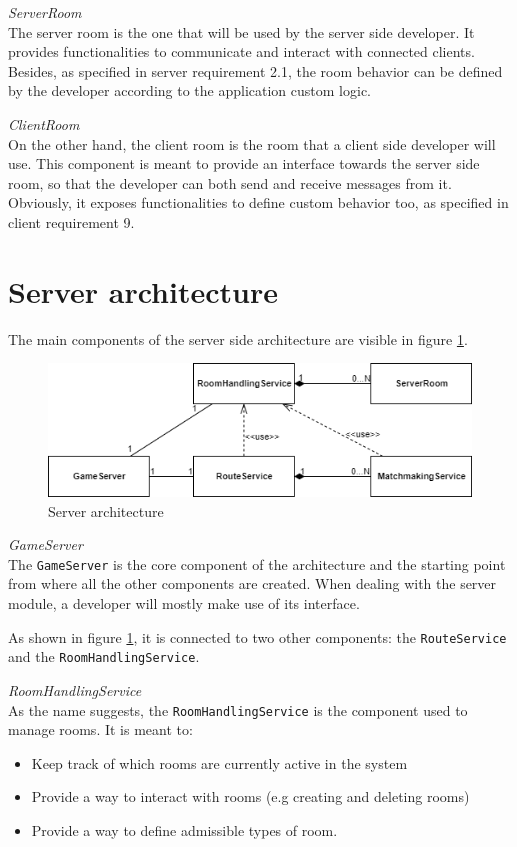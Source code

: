 \bigskip
\textit{ServerRoom}
\\
The server room is the one that will be used by the server side developer. It provides functionalities to communicate and interact with connected clients. Besides, as specified in server requirement 2.1, the room behavior can be defined by the developer according to the application custom logic.

\bigskip
\textit{ClientRoom}
\\
On the other hand, the client room is the room that a client side developer will use. This component is meant to provide an interface towards the server side room, so that the developer can both send and receive messages from it. Obviously, it exposes functionalities to define custom behavior too, as specified in client requirement 9.

\section{Server architecture} \label{sec:server_arch}
The main components of the server side architecture are visible in figure \ref{fig:server_classes}. 

\begin{figure}[H]
	\centering
	\includegraphics[scale=0.7]{images/3-architecture/server-architecture.png}
	\caption{Server architecture}
	\label{fig:server_classes}
\end{figure}

\bigskip
\textit{GameServer}
\\
The \texttt{GameServer} is the core component of the architecture and the starting point from where all the other components are created.
When dealing with the server module, a developer will mostly make use of its interface.

As shown in figure \ref{fig:server_classes}, it is connected to two other components: the \texttt{RouteService} and the \texttt{RoomHandlingService}.

\bigskip
\textit{RoomHandlingService}
\\
As the name suggests, the \texttt{RoomHandlingService} is the component used to manage rooms. It is meant to:
\begin{itemize}
	\item Keep track of which rooms are currently active in the system
	\item Provide a way to interact with rooms (e.g creating and deleting rooms)
	\item Provide a way to define admissible types of room.
\end{itemize}

